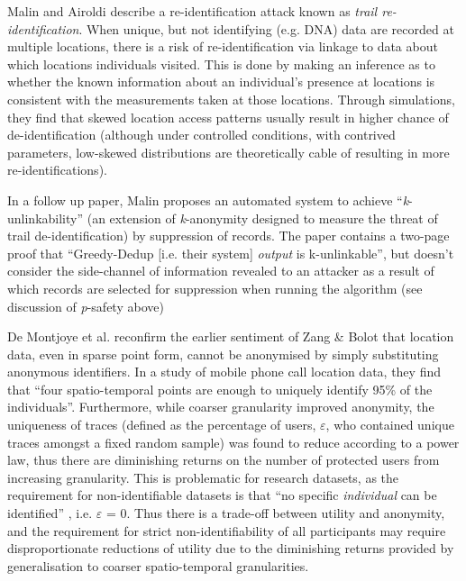 Malin and Airoldi \cite{Malin2006} describe a re-identification attack known as \textit{trail re-identification}. When unique, but not identifying (e.g. DNA) data are recorded at multiple locations, there is a risk of re-identification via linkage to data about which locations individuals visited. This is done by making an inference as to whether the known information about an individual's presence at locations is consistent with the measurements taken at those locations. Through simulations, they find that skewed location access patterns usually result in higher chance of de-identification (although under controlled conditions, with contrived parameters, low-skewed distributions are theoretically cable of resulting in more re-identifications).

In a follow up paper, Malin \cite{Malin2007} proposes an automated system to achieve ``\textit{k}-unlinkability'' (an extension of \textit{k}-anonymity designed to measure the threat of trail de-identification) by suppression of records. The paper contains a two-page proof that ``Greedy-Dedup [i.e. their system] \textit{output} is k-unlinkable'', but doesn't consider the side-channel of information revealed to an attacker as a result of which records are selected for suppression when running the algorithm (see discussion of \textit{p}-safety above) %

De Montjoye et al. \cite{DeMontjoye2013} reconfirm the earlier sentiment of Zang \& Bolot \cite{Zang2011} that location data, even in sparse point form, cannot be anonymised by simply substituting anonymous identifiers. In a study of mobile phone call location data, they find that ``four spatio-temporal points are enough to uniquely identify 95\% of the individuals''. Furthermore, while coarser granularity improved anonymity, the uniqueness of traces (defined as the percentage of users, $\varepsilon$, who contained unique traces amongst a fixed random sample) was found to reduce according to a power law, thus there are diminishing returns on the number of protected users from increasing granularity. This is problematic for research datasets, as the requirement for non-identifiable datasets is that ``no specific \textit{individual} can be identified'' \cite{NationalStatement2015}, i.e. $\varepsilon$ = 0. Thus there is a trade-off between utility and anonymity, and the requirement for strict non-identifiability of all participants may require disproportionate reductions of utility due to the diminishing returns provided by generalisation to coarser spatio-temporal granularities.

